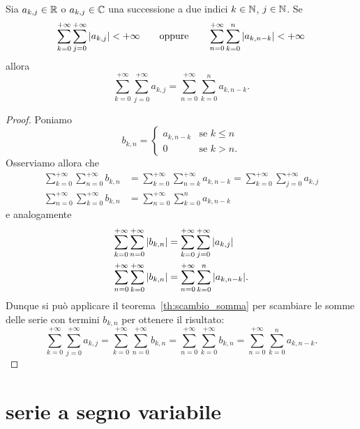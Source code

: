 \begin{theorem}
  \label{th:somma_Cauchy}%
Sia $a_{k,j}\in {\mathbb R}$ o $a_{k,j}\in {\mathbb C}$ una successione a due indici $k\in {\mathbb N}$, $j\in{\mathbb N}$.
Se 
\[
  \sum_{k=0}^{+\infty} \sum_{j=0}^{+\infty} {\left|a_{k,j}\right|} < +\infty
  \qquad\text{oppure}\qquad 
  \sum_{n=0}^{+\infty} \sum_{k=0}^n {\left|a_{k,n-k}\right|} < +\infty
\]  
allora 
\begin{equation}\label{eq:somma_Cauchy}
  \sum_{k=0}^{+\infty} \sum_{j=0}^{+\infty} a_{k,j}
   = \sum_{n=0}^{+\infty} \sum_{k=0}^{n} a_{k,n-k}.
\end{equation}
\end{theorem}
%
\begin{proof}
Poniamo 
\[
  b_{k,n} = \begin{cases}
    a_{k,n-k} & \text{se $k\le n$}\\
    0 & \text{se $k>n$}.
  \end{cases}  
\]
Osserviamo allora che 
\begin{align*}
  \sum_{k=0}^{+\infty} \sum_{n=0}^{+\infty} b_{k,n}
  &= \sum_{k=0}^{+\infty} \sum_{n=k}^{+\infty} a_{k,n-k} 
  = \sum_{k=0}^{+\infty} \sum_{j=0}^{+\infty} a_{k,j}
  \\
  \sum_{n=0}^{+\infty}\sum_{k=0}^{+\infty} b_{k,n} 
  &= \sum_{n=0}^{+\infty}\sum_{k=0}^{n} a_{k,n-k}
\end{align*}
e analogamente
\begin{align*}
  \sum_{k=0}^{+\infty} \sum_{n=0}^{+\infty} {\left|b_{k,n}\right|}
  &= \sum_{k=0}^{+\infty} \sum_{j=0}^{+\infty} {\left|a_{k,j}\right|}
  \\
  \sum_{n=0}^{+\infty} \sum_{k=0}^{+\infty} {\left|b_{k,n}\right|}
  &= \sum_{n=0}^{+\infty} \sum_{k=0}^{n} {\left|a_{k,n-k}\right|}.  
\end{align*}
Dunque si può applicare il teorema~\ref{th:scambio_somma}
per scambiare le somme delle serie con termini $b_{k,n}$
per ottenere il risultato:
\[
  \sum_{k=0}^{+\infty} \sum_{j=0}^{+\infty} a_{k,j}
  = \sum_{k=0}^{+\infty}\sum_{n=0}^{+\infty} b_{k,n} 
  = \sum_{n=0}^{+\infty} \sum_{k=0}^{+\infty} b_{k,n}
  = \sum_{n=0}^{+\infty} \sum_{k=0}^{n} a_{k,n-k}.
\]
\end{proof}

\section{serie a segno variabile}

